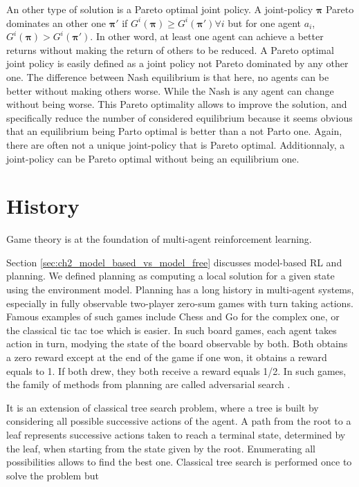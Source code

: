 An other type of solution is a Pareto optimal joint policy.
A joint-policy $\mathbf{\pi}$ Pareto dominates an other one $\mathbf{\pi'}$ if $G^i(\mathbf{\pi}) \ge G^i(\mathbf{\pi'})\forall i$ but for one agent $a_i$, $G^i(\mathbf{\pi}) > G^i(\mathbf{\pi'})$.
In other word, at least one agent can achieve a better returns without making the return of others to be reduced.
A Pareto optimal joint policy is easily defined as a joint policy not Pareto dominated by any other one.
The difference between Nash equilibrium is that here, no agents can be better without making others worse.
While the Nash is any agent can change without being worse.
This Pareto optimality allows to improve the solution, and specifically reduce the number of considered equilibrium because it seems obvious that an equilibrium being Parto optimal is better than a not Parto one.
Again, there are often not a unique joint-policy that is Pareto optimal.
Additionnaly, a joint-policy can be Pareto optimal without being an equilibrium one.




\section{History}\label{sec:ch6_history}
Game theory is at the foundation of multi-agent reinforcement learning.



Section \ref{sec:ch2_model_based_vs_model_free} discusses model-based RL and planning.
We defined planning as computing a local solution for a given state using the environment model.
Planning has a long history in multi-agent systems, especially in fully observable two-player zero-sum games with turn taking actions.
Famous examples of such games include Chess and Go for the complex one, or the classical tic tac toe which is easier.
In such board games, each agent takes action in turn, modying the state of the board observable by both.
Both obtains a zero reward except at the end of the game if one won, it obtains a reward equals to 1.
If both drew, they both receive a reward equals 1/2.
In such games, the family of methods from planning are called adversarial search \citep{russel2010}.

It is an extension of classical tree search problem, where a tree is built by considering all possible successive actions of the agent.
A path from the root to a leaf represents successive actions taken to reach a terminal state, determined by the leaf, when starting from the state given by the root.
Enumerating all possibilities allows to find the best one.
Classical tree search is performed once to solve the problem but 




